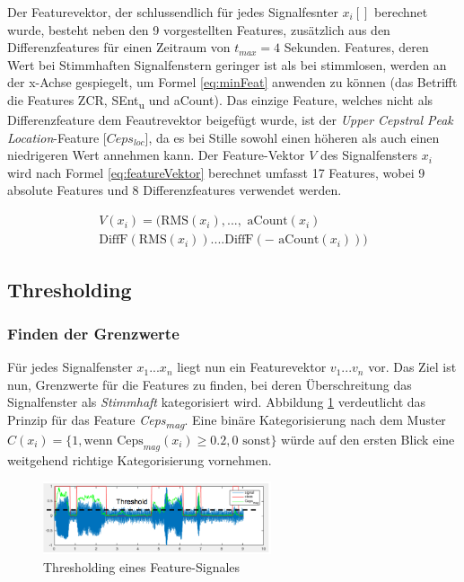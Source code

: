 Der Featurevektor, der schlussendlich für jedes Signalfesnter $x_i[]$ berechnet wurde, besteht neben den 9 vorgestellten Features, zusätzlich aus den Differenzfeatures für einen Zeitraum von $t_{max} = 4$ Sekunden. Features, deren Wert bei Stimmhaften Signalfenstern geringer ist als bei stimmlosen, werden an der x-Achse gespiegelt, um Formel \ref{eq:minFeat} anwenden zu können (das Betrifft die Features ZCR, SEnt\textsubscript{u} und aCount). Das einzige Feature, welches nicht als Differenzfeature dem Feautrevektor beigefügt wurde, ist der \emph{Upper Cepstral Peak Location}-Feature [$Ceps_{loc}$], da es bei Stille sowohl einen höheren als auch einen niedrigeren Wert annehmen kann. Der Feature-Vektor $V$ des Signalfensters $x_i$ wird nach Formel \ref{eq:featureVektor} berechnet umfasst 17 Features, wobei 9 absolute Features und 8 Differenzfeatures verwendet werden.

\begin{equation}
\begin{split}
V(x_i) = \Big( \text{RMS}(x_i), ...,\text{ aCount}(x_i)\\
\text{DiffF}(\text{RMS}(x_i)) .... \text{DiffF}(-\text{ aCount}(x_i))\Big)
\end{split}
\label{eq:featureVektor}
\end{equation}

\subsection{Thresholding}

\subsubsection{Finden der Grenzwerte}

Für jedes Signalfenster $x_1...x_n$ liegt nun ein Featurevektor $v_1...v_n$ vor. Das Ziel ist nun, Grenzwerte für die Features zu finden, bei deren Überschreitung das Signalfenster als \emph{Stimmhaft} kategorisiert wird. Abbildung \ref{img:thresholded} verdeutlicht das Prinzip für das Feature \emph{Ceps\textsubscript{mag}}. Eine binäre Kategorisierung nach dem Muster $C(x_i) = \{ 1, \text{wenn} \text{ Ceps}_{mag}(x_i) \geq 0.2 , 0 \text{ sonst}\}$ würde auf den ersten Blick eine weitgehend richtige Kategorisierung vornehmen.

\begin{figure}[h]
	\centering
	\includegraphics[width=0.6\textwidth]{bilder/thresholded.png}
	\caption{Thresholding eines Feature-Signales}
	\label{img:thresholded}
\end{figure}

